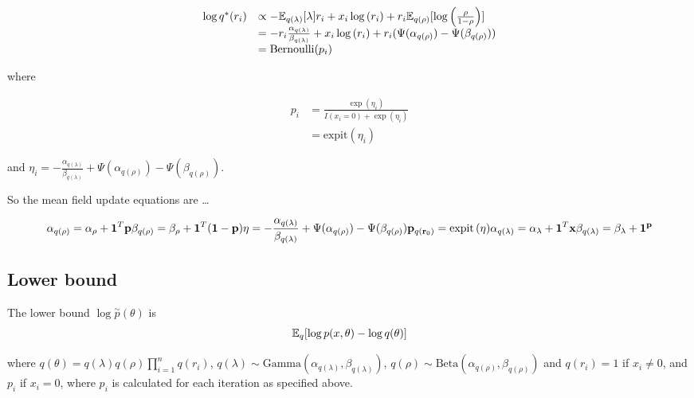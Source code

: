 \documentclass{amsart}
\begin{document}
$$
\begin{array}{ll}
\log{q^*(r_i)} &\propto -{\mathbb E}_{q(\lambda)} [\lambda ] r_i + x_i \log{(r_i)} + r_i {\mathbb E}_{q(\rho)} [\log{\left(\frac{\rho}{1 - \rho}\right)}]\\
&= -r_i \frac{\alpha_{q(\lambda)}}{\beta_{q(\lambda)}} + x_i \log{(r_i)} + r_i (\Psi(\alpha_{q(\rho)}) - \Psi(\beta_{q(\rho)}))\\
&= \text{Bernoulli}(p_i)
\end{array}
$$

where

$$
\begin{array}{ll}
p_i &= \frac{\exp{(\eta_i)}}{I(x_i = 0) + \exp{(\eta_i)}} \\
&= \text{expit}(\eta_i)
\end{array}
$$

and $\eta_i = -\frac{\alpha_{q(\lambda)}}{\beta_{q(\lambda)}} + \Psi(\alpha_{q(\rho)}) - \Psi(\beta_{q(\rho)})$.







So the mean field update equations are \ldots

$$
\alpha_{q(\rho)} = \alpha_\rho + {\bf 1}^T{\bf p}
\beta_{q(\rho)} = \beta_\rho + {\bf 1}^T({\bf 1} - {\bf p})
\eta = -\frac{\alpha_{q(\lambda)}}{\beta_{q(\lambda)}} + \Psi(\alpha_{q(\rho)}) - \Psi(\beta_{q(\rho)})
{\bf p}_{q({\bf r}_0)} = {\text{expit} \left( \eta \right)}
\alpha_{q(\lambda)} = \alpha_\lambda+ {\bf 1}^T{\bf x}
\beta_{q(\lambda)} = \beta_\lambda+ {\bf 1}^{\bf p}
$$

\subsection{Lower bound}
The lower bound $\log{\stackrel{\sim}{p}(\theta)}$ is
$$
	{\mathbb E}_q[\log{p(x, \theta)} - \log{q(\theta)}]
$$

where $q(\theta) = q(\lambda) q(\rho) \prod_{i=1}^n q(r_i)$,
$q(\lambda) \sim \text{Gamma}{(\alpha_{q(\lambda)}, \beta_{q(\lambda)})}$,
$q(\rho) \sim \text{Beta}(\alpha_{q(\rho)}, \beta_{q(\rho)})$ and
$q(r_i) = 1$ if $x_i \ne 0$, and $p_i$ if $x_i = 0$, where $p_i$ is
calculated for each iteration as specified above.
\end{document}
